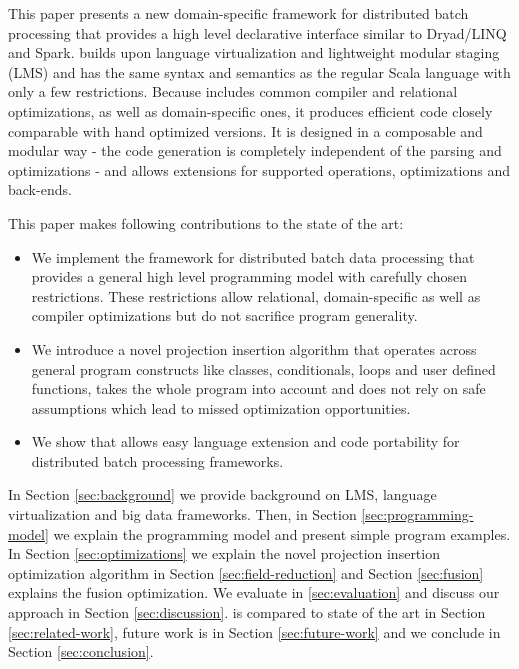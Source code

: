 This paper presents \tool a new domain-specific framework for distributed batch
processing that provides a high level declarative interface similar to
Dryad/LINQ and Spark. \tool builds upon language virtualization
\cite{moors_scala-virtualized_2012} and lightweight modular staging
\cite{rompf_lightweight_2010} (LMS) and has the same syntax and semantics as the
regular Scala language with only a few restrictions.
Because \tool includes common compiler and relational optimizations, as well as
domain-specific ones, it produces efficient code closely comparable with hand
optimized versions.
It is designed in a composable and modular way - the code generation is
completely independent of the parsing and optimizations - and allows extensions
for supported operations, optimizations and back-ends.

This paper makes following contributions to the state of the art:
\begin{itemize}

  \item We implement the \tool framework for distributed batch data
  processing that provides a general high level programming model with carefully
  chosen restrictions. These restrictions allow relational, domain-specific as well as
  compiler optimizations but do not sacrifice program generality.

  \item We introduce a novel projection insertion algorithm that operates across
  general program constructs like classes, conditionals, loops and user defined
  functions, takes the whole program into account and does not rely on safe
  assumptions which lead to missed optimization opportunities.

  \item We show that \tool allows easy language extension and code portability
  for distributed batch processing frameworks.

\end{itemize} 

In Section \ref{sec:background} we provide background on LMS,
language virtualization and big data frameworks. Then, in Section
\ref{sec:programming-model} we explain the programming model and present simple
program examples. In Section \ref{sec:optimizations} we explain the novel
projection insertion optimization algorithm in Section \ref{sec:field-reduction}
and Section \ref{sec:fusion} explains the fusion optimization. We evaluate \tool
in \ref{sec:evaluation} and discuss our approach in Section
\ref{sec:discussion}. \tool is compared to state of the art in Section
\ref{sec:related-work}, future work is in Section \ref{sec:future-work} and we
conclude in Section \ref{sec:conclusion}.
